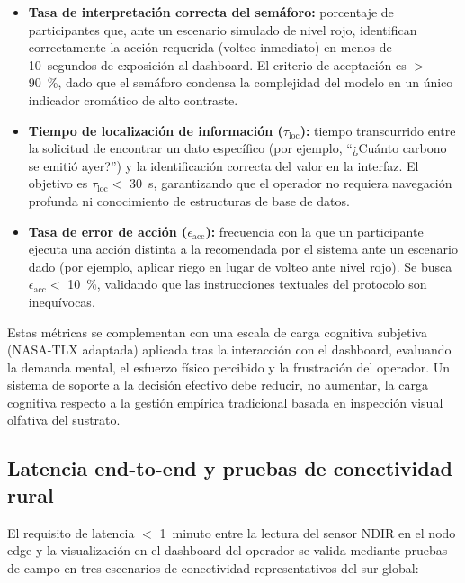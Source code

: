 \begin{itemize}
    \item \textbf{Tasa de interpretación correcta del semáforo:} porcentaje de participantes que, ante un escenario simulado de nivel rojo, identifican correctamente la acción requerida (volteo inmediato) en menos de \num{10}~segundos de exposición al dashboard. El criterio de aceptación es $>$ \num{90}~\%, dado que el semáforo condensa la complejidad del modelo en un único indicador cromático de alto contraste.
    
    \item \textbf{Tiempo de localización de información ($\tau_{\text{loc}}$):} tiempo transcurrido entre la solicitud de encontrar un dato específico (por ejemplo, ``¿Cuánto carbono se emitió ayer?'') y la identificación correcta del valor en la interfaz. El objetivo es $\tau_{\text{loc}} <$ \num{30}~s, garantizando que el operador no requiera navegación profunda ni conocimiento de estructuras de base de datos.
    
    \item \textbf{Tasa de error de acción ($\epsilon_{\text{acc}}$):} frecuencia con la que un participante ejecuta una acción distinta a la recomendada por el sistema ante un escenario dado (por ejemplo, aplicar riego en lugar de volteo ante nivel rojo). Se busca $\epsilon_{\text{acc}} <$ \num{10}~\%, validando que las instrucciones textuales del protocolo son inequívocas.
\end{itemize}

Estas métricas se complementan con una escala de carga cognitiva subjetiva (NASA-TLX adaptada) aplicada tras la interacción con el dashboard, evaluando la demanda mental, el esfuerzo físico percibido y la frustración del operador. Un sistema de soporte a la decisión efectivo debe reducir, no aumentar, la carga cognitiva respecto a la gestión empírica tradicional basada en inspección visual olfativa del sustrato.

\subsection{Latencia end-to-end y pruebas de conectividad rural}
\label{subsec:cap5_latencia}

El requisito de latencia $<$ \num{1}~minuto entre la lectura del sensor NDIR en el nodo edge y la visualización en el dashboard del operador se valida mediante pruebas de campo en tres escenarios de conectividad representativos del sur global:

